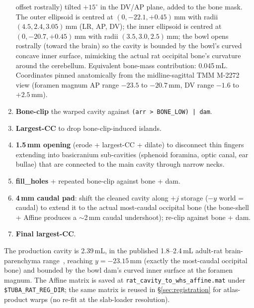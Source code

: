 \documentclass{compactarticle}
\begin{document}
\begin{enumerate}[leftmargin=*]
        offset rostrally) tilted $+15^\circ$ in the DV/AP plane,
        added to the bone mask. The outer ellipsoid is centred at
        $(0, -22.1, +0.45)$\,mm with radii $(4.5, 2.4, 3.05)$\,mm
        (LR, AP, DV); the inner ellipsoid is centred at
        $(0, -20.7, +0.45)$\,mm with radii $(3.5, 3.0, 2.5)$\,mm;
        the bowl opens rostrally (toward the brain) so the cavity
        is bounded by the bowl's curved concave inner surface,
        mimicking the actual rat occipital bone's curvature around
        the cerebellum. Equivalent bone-mass contribution: 0.045\,mL.
        Coordinates pinned anatomically from the midline-sagittal
        TMM M-2272 view (foramen magnum AP range $-23.5$ to
        $-20.7$\,mm, DV range $-1.6$ to $+2.5$\,mm).
  \item \textbf{Bone-clip} the warped cavity against
        \texttt{(arr > BONE\_LOW) | dam}.
  \item \textbf{Largest-CC} to drop bone-clip-induced islands.
  \item \textbf{1.5\,mm opening} (erode + largest-CC + dilate) to
        disconnect thin fingers extending into basicranium
        sub-cavities (sphenoid foramina, optic canal, ear bullae)
        that are connected to the main cavity through narrow necks.
  \item \textbf{fill\_holes} + repeated bone-clip against bone + dam.
  \item \textbf{4\,mm caudal pad}: shift the cleaned cavity along
        $+j$ storage ($-y$ world = caudal) to extend it to the actual
        most-caudal occipital bone (the bone-shell + Affine produces
        a $\sim$2\,mm caudal undershoot); re-clip against bone + dam.
  \item \textbf{Final largest-CC}.
\end{enumerate}

The production cavity is 2.39\,mL, in the published 1.8--2.4\,mL
adult-rat brain-parenchyma range~\cite{rat-volume}, reaching
$y=-23.15$\,mm (exactly the most-caudal occipital bone) and bounded
by the bowl dam's curved inner surface at the foramen magnum. The
Affine matrix is saved at
\texttt{rat\_cavity\_to\_whs\_affine.mat} under
\texttt{\$TUBA\_RAT\_REG\_DIR}; the same matrix is reused in
\S\ref{sec:registration} for atlas-product warps (no re-fit at the
slab-loader resolution).
\end{document}
